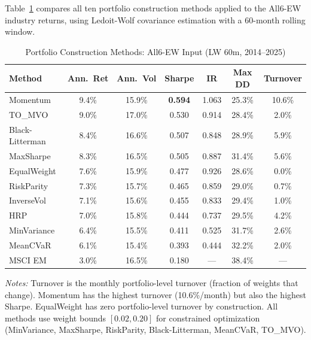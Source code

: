 \documentclass[12pt,a4paper]{article}
\begin{document}
Table~\ref{tab:pc} compares all ten portfolio construction methods applied to the All6-EW industry returns, using Ledoit-Wolf covariance estimation with a 60-month rolling window.

\begin{table}[H]
\centering
\caption{Portfolio Construction Methods: All6-EW Input (LW 60m, 2014--2025)}
\label{tab:pc}
\small
\begin{tabular}{lcccccc}
\toprule
\textbf{Method} & \textbf{Ann.\ Ret} & \textbf{Ann.\ Vol} & \textbf{Sharpe} & \textbf{IR} & \textbf{Max DD} & \textbf{Turnover} \\
\midrule
Momentum        & 9.4\%  & 15.9\% & \textbf{0.594} & 1.063 & 25.3\% & 10.6\% \\
TO\_MVO         & 9.0\%  & 17.0\% & 0.530 & 0.914 & 28.4\% & 2.0\% \\
Black-Litterman & 8.4\%  & 16.6\% & 0.507 & 0.848 & 28.9\% & 5.9\% \\
MaxSharpe       & 8.3\%  & 16.5\% & 0.505 & 0.887 & 31.4\% & 5.6\% \\
EqualWeight     & 7.6\%  & 15.9\% & 0.477 & 0.926 & 28.6\% & 0.0\% \\
RiskParity      & 7.3\%  & 15.7\% & 0.465 & 0.859 & 29.0\% & 0.7\% \\
InverseVol      & 7.1\%  & 15.6\% & 0.455 & 0.833 & 29.4\% & 1.0\% \\
HRP             & 7.0\%  & 15.8\% & 0.444 & 0.737 & 29.5\% & 4.2\% \\
MinVariance     & 6.4\%  & 15.5\% & 0.411 & 0.525 & 31.7\% & 2.6\% \\
MeanCVaR        & 6.1\%  & 15.4\% & 0.393 & 0.444 & 32.2\% & 2.0\% \\
\midrule
MSCI EM         & 3.0\%  & 16.5\% & 0.180 & ---   & 38.4\% & --- \\
\bottomrule
\end{tabular}
\begin{minipage}{\textwidth}
\vspace{0.3em}
\footnotesize
\textit{Notes:} Turnover is the monthly portfolio-level turnover (fraction of weights that change). Momentum has the highest turnover (10.6\%/month) but also the highest Sharpe. EqualWeight has zero portfolio-level turnover by construction. All methods use weight bounds $[0.02, 0.20]$ for constrained optimization (MinVariance, MaxSharpe, RiskParity, Black-Litterman, MeanCVaR, TO\_MVO).
\end{minipage}
\end{table}
\end{document}
